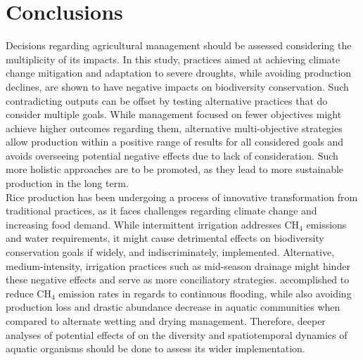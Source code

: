 \section{Conclusions}
\label{sec:conc1}

Decisions regarding agricultural management should be assessed considering the multiplicity of its impacts. In this study, practices aimed at achieving climate change mitigation and adaptation to severe droughts, while avoiding production declines, are shown to have negative impacts on biodiversity conservation. Such contradicting outputs can be offset by testing alternative practices that do consider multiple goals. While management focused on fewer objectives might achieve higher outcomes regarding them, alternative multi-objective strategies allow production within a positive range of results for all considered goals and avoids overseeing potential negative effects due to lack of consideration. Such more holistic approaches are to be promoted, as they lead to more sustainable production in the long term. \\

Rice production has been undergoing a process of innovative transformation from traditional practices, as it faces challenges regarding climate change and increasing food demand. While intermittent irrigation addresses CH$_{4}$ emissions and water requirements, it might cause detrimental effects on biodiversity conservation goals if widely, and indiscriminately, implemented.  Alternative, medium-intensity, irrigation practices such as mid-season drainage might hinder these negative effects and serve as more conciliatory strategies. accomplished to reduce CH$_{4}$ emission rates in regards to continuous flooding, while also avoiding production loss and drastic abundance decrease in aquatic communities when compared to alternate wetting and drying management. Therefore, deeper analyses of potential effects of  on the diversity and spatiotemporal dynamics of aquatic organisms should be done to assess its wider implementation.\\

